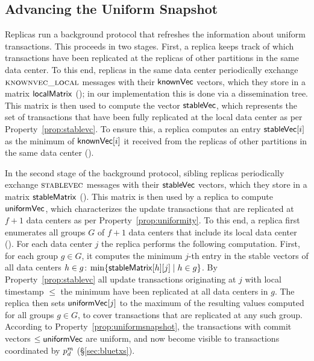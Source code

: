 \subsection{Advancing the Uniform Snapshot}
\label{sec:clockcomputation}

Replicas run a background protocol that refreshes the information about uniform
transactions.
This proceeds in two stages. First, a replica keeps track of which transactions
have been replicated at the replicas of other partitions in the same data
center. To this end, replicas in the same data center periodically exchange
$\textsc{knownvec\_local}$ messages with their ${\sf knownVec}$ vectors, which they store in
a matrix ${\sf localMatrix}$
();
in our implementation this is done via a dissemination tree. This
matrix is then used to compute the vector ${\sf stableVec}$, which represents
the set of transactions that have been fully replicated at the local data center
as per Property~\ref{prop:stablevc}. To ensure this, a replica computes an entry
${\sf stableVec}[i]$ as the minimum of ${\sf knownVec}[i]$ it received from
the replicas of other partitions in the same data center
().



In the second stage of the background protocol, sibling replicas periodically
exchange $\textsc{stablevec}$ messages with their ${\sf stableVec}$ vectors, which they
store in a matrix ${\sf stableMatrix}$
(). This
matrix is then used by a replica
to compute ${\sf uniformVec}$, which characterizes the update transactions that
are replicated at $f+1$ data centers as per Property~\ref{prop:uniformity}. To
this end, a replica first enumerates all groups $G$ of $f+1$ data centers that
include its local data center (). For each
data center $j$ the replica performs the following computation. First, for each
group $g \in G$, it computes the minimum $j$-th entry in the stable vectors of
all data centers $h \in g$:
$\min\{{\sf stableMatrix}[h][j]\mid h\in g\}$. By Property~\ref{prop:stablevc}
all update transactions originating at $j$ with local timestamp $\le$ the
minimum have been replicated at all data centers in $g$. The replica then sets
${\sf uniformVec}[j]$ to the maximum of the resulting values computed for all
groups $g \in G$, to cover transactions that are replicated at any such group.
According to Property~\ref{prop:uniformsnapshot}, the transactions with commit
vectors $\leq {\sf uniformVec}$ are uniform, and now become visible to
transactions coordinated by $\partition^m_d$ (\S\ref{sec:bluetxs}).



